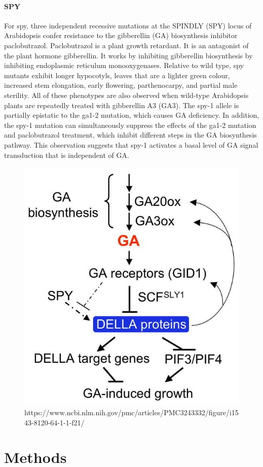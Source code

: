 \documentclass[10pt,a4paper]{article}
\begin{document}
\paragraph{SPY}
For spy, three independent recessive mutations at the SPINDLY (SPY) locus of Arabidopsis confer resistance to the gibberellin (GA) biosynthesis inhibitor paclobutrazol. Paclobutrazol is a plant growth retardant. It is an antagonist of the plant hormone gibberellin. It works by inhibiting gibberellin biosynthesis by inhibiting endoplasmic reticulum monooxygenases. Relative to wild type, spy mutants exhibit longer hypocotyls, leaves that are a lighter green colour, increased stem elongation, early flowering, parthenocarpy, and partial male sterility. All of these phenotypes are also observed when wild-type Arabidopsis plants are repeatedly treated with gibberellin A3 (GA3). The spy-1 allele is partially epistatic to the ga1-2 mutation, which causes GA deficiency. In addition, the spy-1 mutation can simultaneously suppress the effects of the ga1-2 mutation and paclobutrazol treatment, which inhibit different steps in the GA biosynthesis pathway. This observation suggests that spy-1 activates a basal level of GA signal transduction that is independent of GA\cite{lee_gibberellin_2002}.



\begin{figure}[H]
	\centering
	\includegraphics[width=0.4\linewidth]{img/GASPYpathway}
	\caption[GAI and SPY pathways]{https://www.ncbi.nlm.nih.gov/pmc/articles/PMC3243332/figure/i1543-8120-64-1-1-f21/}
	\label{fig:gaspypathway}
\end{figure}


\section*{Methods} 
\end{document}
